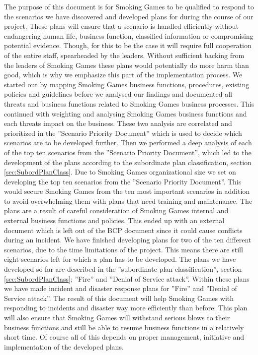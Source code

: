 The purpose of this document is for Smoking Games to be qualified to respond to the scenarios we have discovered and developed plans for during the course of our project. These plans will ensure that a scenario is handled efficiently without endangering human life, business function, classified information or compromising potential evidence. Though, for this to be the case it will require full cooperation of the entire staff, spearheaded by the leaders. Without sufficient backing from the leaders of Smoking Games these plans would potentially do more harm than good, which is why we emphasize this part of the implementation process.
We started out by mapping Smoking Games business functions, procedures, existing policies and guidelines before we analysed our findings and documented all threats and business functions related to Smoking Games business processes. This continued with weighting and analysing Smoking Games business functions and each threats impact on the business. These two analysis are correlated and prioritized in the ”Scenario Priority Document” which is used to decide which scenarios are to be developed further.
Then we performed a deep analysis of each of the top ten scenarios from the ”Scenario Priority Document”, which led to the development of the plans according to the subordinate plan classification, section \ref{sec:SubordPlanClass}.
Due to Smoking Games organizational size we set on developing the top ten scenarios from the ”Scenario Priority Document”. This would secure Smoking Games from the ten most important scenarios in addition to avoid overwhelming them with plans that need training and maintenance.
The plans are a result of careful consideration of Smoking Games internal and external business functions and policies. This ended up with an external document which is left out of the BCP document since it could cause conflicts during an incident.
We have finished developing plans for two of the ten different scenarios, due to the time limitations of the project. This means there are still eight scenarios left for which a plan has to be developed.
The plans we have developed so far are described in the ”subordinate plan classification”, section \ref{sec:SubordPlanClass}; ”Fire” and ”Denial of Service attack”. Within these plans we have made incident and disaster response plans for ”Fire” and ”Denial of Service attack”.
The result of this document will help Smoking Games with responding to incidents and disaster way more efficiently than before. This plan will also ensure that Smoking Games will withstand serious blows to their business functions and still be able to resume business functions in a relatively short time. 
Of course all of this depends on proper management, initiative and implementation of the developed plans.